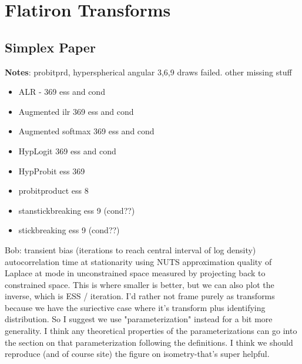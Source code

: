 \section{Flatiron Transforms}
\label{sec:transforms}
\subsection{Simplex Paper}


\textbf{Notes}: probitprd, hyperspherical angular 3,6,9 draws failed. other missing stuff
\begin{itemize}
\item ALR - 369 ess and cond
\item Augmented ilr 369 ess and cond
\item Augmented softmax 369 ess and cond
\item HypLogit 369 ess and cond
\item HypProbit ess 369

\item probitproduct ess 8
\item stanstickbreaking ess 9 (cond??)
\item stickbreaking ess 9 (cond??)
\end{itemize}


Bob: transient bias (iterations to reach central interval of log density)
autocorrelation time at stationarity using NUTS
approximation quality of Laplace at mode in unconstrained space measured by projecting back to constrained space. This is where smaller is better, but we can also plot the inverse, which is ESS / iteration. I'd rather not frame purely as transforms because we have the suriective case where it's transform plus identifying distribution. So I suggest we use "parameterization" instead for a bit more generality. I think any theoretical properties of the parameterizations can go into the section on that parameterization following the definitions. I think we should reproduce (and of course site) the figure on isometry-that's super helpful.